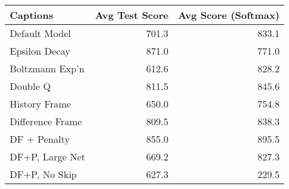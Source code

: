 \begin{tabular}{lrr}
\toprule
         Captions &  Avg Test Score &  Avg Score (Softmax) \\
\midrule
    Default Model &           701.3 &                833.1 \\
    Epsilon Decay &           871.0 &                771.0 \\
  Boltzmann Exp'n &           612.6 &                828.2 \\
         Double Q &           811.5 &                845.6 \\
    History Frame &           650.0 &                754.8 \\
 Difference Frame &           809.5 &                838.3 \\
     DF + Penalty &           855.0 &                895.5 \\
  DF+P, Large Net &           669.2 &                827.3 \\
    DF+P, No Skip &           627.3 &                229.5 \\
\bottomrule
\end{tabular}
